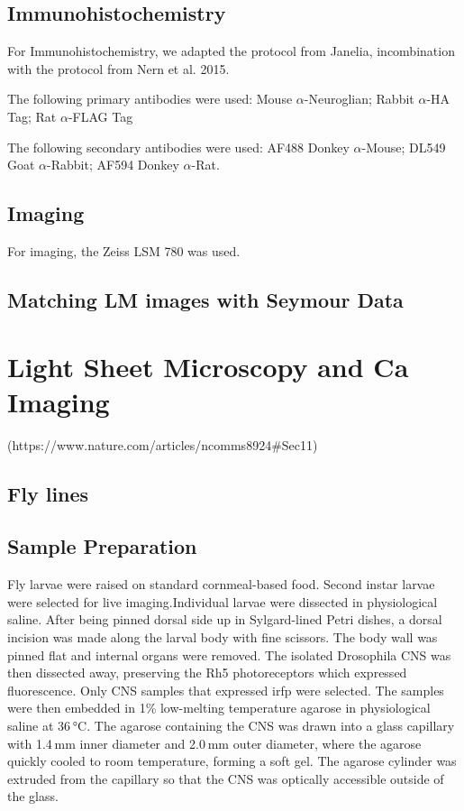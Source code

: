 \subsection{Immunohistochemistry}
For Immunohistochemistry, we adapted the protocol from Janelia, incombination with the protocol from Nern et al. 2015.

The following primary antibodies were used: Mouse $\alpha$-Neuroglian; Rabbit $\alpha$-HA Tag; Rat $\alpha$-FLAG Tag

The following secondary antibodies were used: AF488 Donkey $\alpha$-Mouse; DL549 Goat $\alpha$-Rabbit;
AF594 Donkey $\alpha$-Rat.



\subsection{Imaging}
For imaging, the Zeiss LSM 780 was used.

\subsection{Matching LM images with Seymour Data} %
\newpage




\section{Light Sheet Microscopy and Ca Imaging}

(https://www.nature.com/articles/ncomms8924#Sec11)

\subsection{Fly lines} %

\subsection{Sample Preparation}
Fly larvae were raised on standard cornmeal-based food.
Second instar larvae were selected for live imaging.Individual larvae were dissected in physiological saline.%
After being pinned dorsal side up in Sylgard-lined Petri dishes, a dorsal incision was made along the larval body with fine scissors. The body wall was pinned flat and internal organs were removed. The isolated Drosophila CNS was then dissected away, preserving the Rh5 photoreceptors which expressed fluorescence.  Only CNS samples that expressed irfp were selected.%
The samples were then embedded in 1\% low-melting temperature agarose in physiological saline at 36 °C. The agarose containing the CNS was drawn into a glass capillary with 1.4 mm inner diameter and 2.0 mm outer diameter, where the agarose quickly cooled to room temperature, forming a soft gel. The agarose cylinder was extruded from the capillary so that the CNS was optically accessible outside of the glass. %



